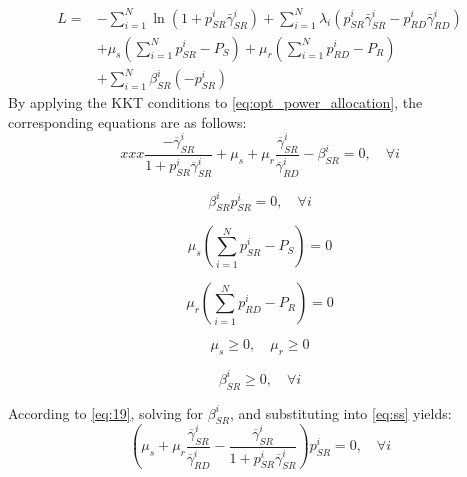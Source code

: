 \documentclass[lettersize,journal]{IEEEtran}
\begin{document}
	\begin{equation}
		\begin{aligned}
			L = & - \sum_{i=1}^{N} \ln(1 + p_{SR}^i \bar{\gamma}_{SR}^i) + \sum_{i=1}^{N} \lambda_i (p_{SR}^i \bar{\gamma}_{SR}^i - p_{RD}^i \bar{\gamma}_{RD}^i) \\
			& + \mu_s \left( \sum_{i=1}^{N} p_{SR}^i - P_S \right) + \mu_r \left( \sum_{i=1}^{N} p_{RD}^i - P_R \right) \\
			& + \sum_{i=1}^{N} \beta_{SR}^i (- p_{SR}^i)
		\end{aligned}
	\end{equation}
	By applying the KKT conditions to \eqref{eq:opt_power_allocation}, the corresponding equations are as follows:
	\begin{equation}xxx
		\frac{- \overline{\gamma}_{SR}^i}{1 + p_{SR}^i \overline{\gamma}_{SR}^i} + \mu_s + \mu_r \frac{\overline{\gamma}_{SR}^i}{\overline{\gamma}_{RD}^i} - \beta_{SR}^i = 0, \quad \forall i
		\label{eq:19}
	\end{equation}
	
	\begin{equation}
		\beta_{SR}^i p_{SR}^i = 0, \quad \forall i
		\label{eq:ss}
	\end{equation}
	
	\begin{equation}
		\mu_s \left( \sum_{i=1}^{N} p_{SR}^i - P_S \right) = 0
		\label{eq:21}
	\end{equation}
	
	\begin{equation}
		\mu_r \left( \sum_{i=1}^{N} p_{RD}^i - P_R \right) = 0
		\label{eq:22}
	\end{equation}
	
	\begin{equation}
		\mu_s \geq 0, \quad \mu_r \geq 0
		\label{eq:23}
	\end{equation}
	
	\begin{equation}
		\beta_{SR}^i \geq 0, \quad \forall i
		\label{eq:24}
	\end{equation}
	
	According to \eqref{eq:19}, solving for \( \beta_{SR}^i \), and substituting into \eqref{eq:ss} yields:
	\begin{equation}
		\left( \mu_s + \mu_r \frac{\overline{\gamma}_{SR}^i}{\overline{\gamma}_{RD}^i} - \frac{\overline{\gamma}_{SR}^i}{1 + p_{SR}^i \overline{\gamma}_{SR}^i} \right) p_{SR}^i = 0, \quad \forall i
		\label{eq:25}
	\end{equation}
	
\end{document}
